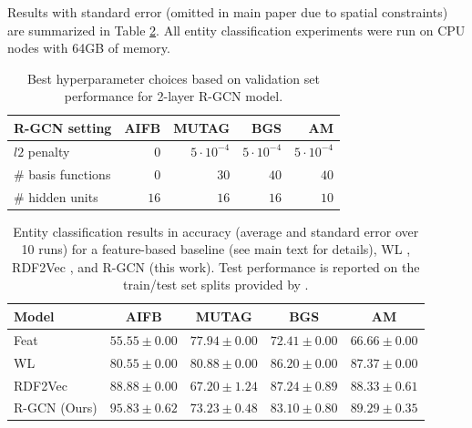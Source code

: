 Results with standard error (omitted in main paper due to spatial constraints) are summarized in Table \ref{table:results}. All entity classification experiments were run on CPU nodes with 64GB of memory.

\begin{table}[htp!]
\centering
\begin{tabular}{lrrrr}
\toprule
R-GCN setting & AIFB & MUTAG & BGS & AM  \\ \midrule
$l2$ penalty & $0$ & $5\cdot 10^{-4}$ & $5\cdot 10^{-4}$ & $5\cdot 10^{-4}$ \\
\# basis functions & $0$ & $30$ & $40$ & $40$  \\
\# hidden units & $16$ & $16$ & $16$ & $10$ \\ \bottomrule
\end{tabular}
\caption{Best hyperparameter choices based on validation set performance for 2-layer R-GCN model. \label{table:hyperparams}}
\end{table}

\begin{table}[htp!]
\centering
\begin{tabular}{lcccc}
\toprule
Model & AIFB & MUTAG & BGS & AM  \\ \midrule
Feat & $55.55\pm0.00$ & $77.94 \pm 0.00$ & $72.41\pm0.00$ & $66.66 \pm 0.00$ \\
WL		& $80.55\pm0.00$ & $\mathbf{80.88}\pm 0.00$ & $86.20\pm 0.00$ & $87.37 \pm 0.00$  \\
RDF2Vec  & $88.88 \pm 0.00$ & $67.20 \pm 1.24$ & $\mathbf{87.24}  \pm 0.89$ & $88.33 \pm 0.61$ \\
R-GCN (Ours)			& $\mathbf{95.83} \pm 0.62$ & $73.23 \pm 0.48$ & $83.10\pm 0.80$  & $\mathbf{89.29} \pm 0.35$ \\\bottomrule
\end{tabular}
\caption{Entity classification results in accuracy (average and standard error over 10 runs) for a feature-based baseline (see main text for details), WL \cite{shervashidze2011weisfeiler,de2015substructure}, RDF2Vec \cite{ristoski2016rdf2vec}, and R-GCN (this work). Test performance is reported on the train/test set splits provided by \cite{ristoski2016collection}. \label{table:results}}
\end{table}
